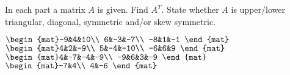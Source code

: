 
\begin{Exercise}[
name={},
title={}, 
difficulty=0,
origin={\cite{GH}}]
In each part a matrix $A$ is given. Find $A^T$. State whether $A$ is upper/lower triangular, diagonal, symmetric and/or skew symmetric.
\begin{multicols}{2}
\Question $\begin{mat}-9&4&10\\  6&-3&-7\\  -8&1&-1 \end{mat}$
\Question $\begin{mat}4&2&-9\\  5&-4&-10\\  -6&6&9 \end{mat}$
\Question $\begin{mat}4&-7&-4&-9\\  -9&6&3&-9 \end{mat}$
\Question $\begin{mat}-7&4\\  4&-6 \end{mat}$

\end{multicols}
\end{Exercise}
